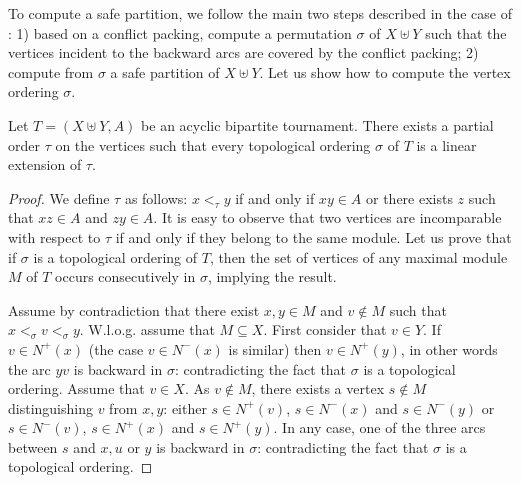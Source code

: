 To compute a safe partition, we follow the main two steps described in the case of \FAST{}: 1) based on a conflict packing, compute a permutation $\sigma$ of $X\uplus Y$ such that the vertices incident to the backward arcs are covered by the conflict packing; 2) compute from $\sigma$ a safe partition of $X\uplus Y$. Let us show how to compute the vertex ordering $\sigma$.

\begin{lemma} \label{lem:module-ordering}
Let $T=(X\uplus Y,A)$ be an acyclic bipartite tournament. There exists a partial order $\tau$ on the vertices such that every topological ordering $\sigma$ of $T$ is a linear extension of $\tau$.
\end{lemma}
\begin{proof}
We define $\tau$ as follows: $x<_{\tau} y$ if and only if $xy\in A$ or there exists $z$ such that $xz\in A$ and $zy\in A$. It is easy to observe that two vertices are incomparable with respect to $\tau$ if and only if they belong to the same module. Let us prove that if $\sigma$ is a topological ordering of $T$, then the set of vertices of any maximal module $M$ of $T$ occurs consecutively in $\sigma$, implying the result.

Assume by contradiction that there exist $x,y\in M$ and $v\notin M$ such that $x<_{\sigma}v<_{\sigma} y$. W.l.o.g. assume that $M\subseteq X$. First consider that $v\in Y$. If  $v\in N^+(x)$ (the case  $v\in N^-(x)$ is similar) then $v\in N^+(y)$, in other words the arc $yv$ is backward in $\sigma$: contradicting the fact that $\sigma$ is a topological ordering. Assume that $v\in X$. As $v\notin M$, there exists a vertex $s\notin M$ distinguishing $v$ from $x,y$: either $s\in N^+(v)$, $s\in N^-(x)$ and $s\in N^-(y)$ or $s\in N^-(v)$, $s\in N^+(x)$ and $s\in N^+(y)$. In any case, one of the three arcs between $s$ and $x, u$ or $y$ is backward in $\sigma$: contradicting the fact that $\sigma$ is a topological ordering.
\end{proof}





